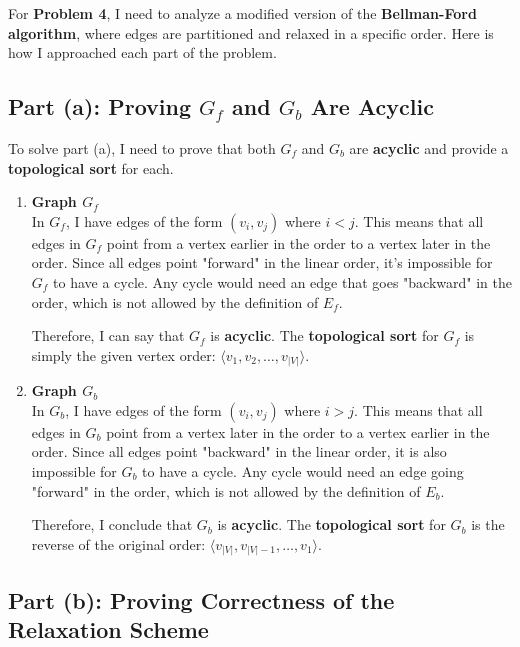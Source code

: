 \documentclass[10pt,letter,notitlepage]{article}
\begin{document}
\begin{Answer}

For \textbf{Problem 4}, I need to analyze a modified version of the \textbf{Bellman-Ford algorithm}, where edges are partitioned and relaxed in a specific order. Here is how I approached each part of the problem.

\subsection*{Part (a): Proving \( G_f \) and \( G_b \) Are Acyclic}

To solve part (a), I need to prove that both \( G_f \) and \( G_b \) are \textbf{acyclic} and provide a \textbf{topological sort} for each.

\begin{enumerate}
    \item \textbf{Graph \( G_f \)} \\
    In \( G_f \), I have edges of the form \( (v_i, v_j) \) where \( i < j \). This means that all edges in \( G_f \) point from a vertex earlier in the order to a vertex later in the order.
    Since all edges point "forward" in the linear order, it’s impossible for \( G_f \) to have a cycle. Any cycle would need an edge that goes "backward" in the order, which is not allowed by the definition of \( E_f \).

    Therefore, I can say that \( G_f \) is \textbf{acyclic}. The \textbf{topological sort} for \( G_f \) is simply the given vertex order: \( \langle v_1, v_2, \ldots, v_{|V|} \rangle \).

    \item \textbf{Graph \( G_b \)} \\
    In \( G_b \), I have edges of the form \( (v_i, v_j) \) where \( i > j \). This means that all edges in \( G_b \) point from a vertex later in the order to a vertex earlier in the order.
    Since all edges point "backward" in the linear order, it is also impossible for \( G_b \) to have a cycle. Any cycle would need an edge going "forward" in the order, which is not allowed by the definition of \( E_b \).

    Therefore, I conclude that \( G_b \) is \textbf{acyclic}. The \textbf{topological sort} for \( G_b \) is the reverse of the original order: \( \langle v_{|V|}, v_{|V|-1}, \ldots, v_1 \rangle \).
\end{enumerate}

\subsection*{Part (b): Proving Correctness of the Relaxation Scheme}


\end{Answer}
\end{document}
